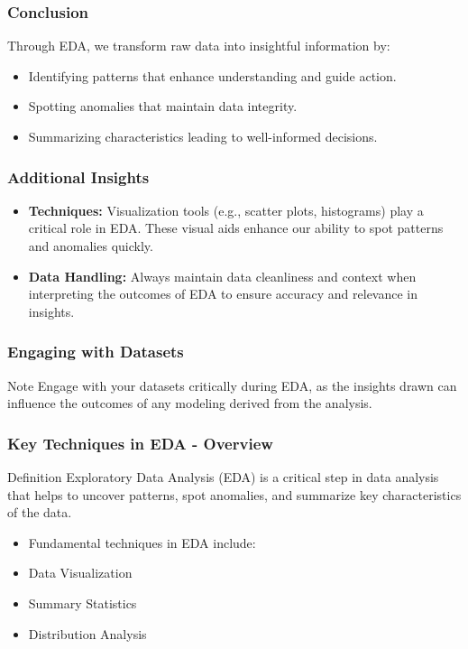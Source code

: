 \documentclass{beamer}
\begin{document}
\begin{frame}[fragile]
    \frametitle{Conclusion}
    Through EDA, we transform raw data into insightful information by:
    \begin{itemize}
        \item Identifying patterns that enhance understanding and guide action.
        \item Spotting anomalies that maintain data integrity.
        \item Summarizing characteristics leading to well-informed decisions.
    \end{itemize}
\end{frame}

\begin{frame}[fragile]
    \frametitle{Additional Insights}
    \begin{itemize}
        \item \textbf{Techniques:} Visualization tools (e.g., scatter plots, histograms) play a critical role in EDA. These visual aids enhance our ability to spot patterns and anomalies quickly.
        \item \textbf{Data Handling:} Always maintain data cleanliness and context when interpreting the outcomes of EDA to ensure accuracy and relevance in insights.
    \end{itemize}
\end{frame}

\begin{frame}[fragile]
    \frametitle{Engaging with Datasets}
    \begin{block}{Note}
        Engage with your datasets critically during EDA, as the insights drawn can influence the outcomes of any modeling derived from the analysis.
    \end{block}
\end{frame}

\begin{frame}[fragile]
    \frametitle{Key Techniques in EDA - Overview}
    
    \begin{block}{Definition}
        Exploratory Data Analysis (EDA) is a critical step in data analysis that helps to uncover patterns, spot anomalies, and summarize key characteristics of the data.
    \end{block}
    
    \begin{itemize}
        \item Fundamental techniques in EDA include:
        \item Data Visualization
        \item Summary Statistics
        \item Distribution Analysis
    \end{itemize}
\end{frame}
\end{document}
